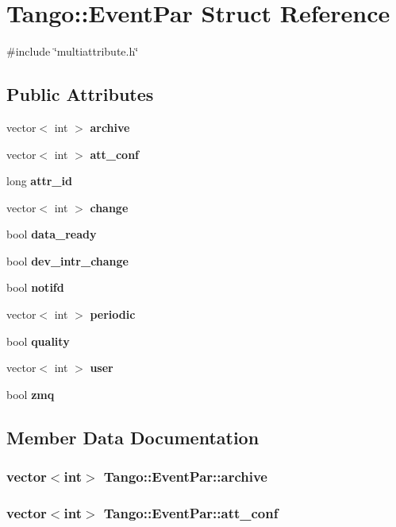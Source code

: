\section{Tango\-:\-:Event\-Par Struct Reference}
\label{structTango_1_1EventPar}


{\ttfamily \#include \char`\"{}multiattribute.\-h\char`\"{}}

\subsection*{Public Attributes}
\begin{DoxyCompactItemize}
\item 
vector$<$ int $>$ {\bf archive}
\item 
vector$<$ int $>$ {\bf att\-\_\-conf}
\item 
long {\bf attr\-\_\-id}
\item 
vector$<$ int $>$ {\bf change}
\item 
bool {\bf data\-\_\-ready}
\item 
bool {\bf dev\-\_\-intr\-\_\-change}
\item 
bool {\bf notifd}
\item 
vector$<$ int $>$ {\bf periodic}
\item 
bool {\bf quality}
\item 
vector$<$ int $>$ {\bf user}
\item 
bool {\bf zmq}
\end{DoxyCompactItemize}


\subsection{Member Data Documentation}
\subsubsection[{archive}]{\setlength{\rightskip}{0pt plus 5cm}vector$<$int$>$ Tango\-::\-Event\-Par\-::archive}\label{structTango_1_1EventPar_a718fed22a39807fccab5f958aa0e77f8}
\subsubsection[{att\-\_\-conf}]{\setlength{\rightskip}{0pt plus 5cm}vector$<$int$>$ Tango\-::\-Event\-Par\-::att\-\_\-conf}\label{structTango_1_1EventPar_a6aeb1616d5afed922b9a5a58871ab55e}
